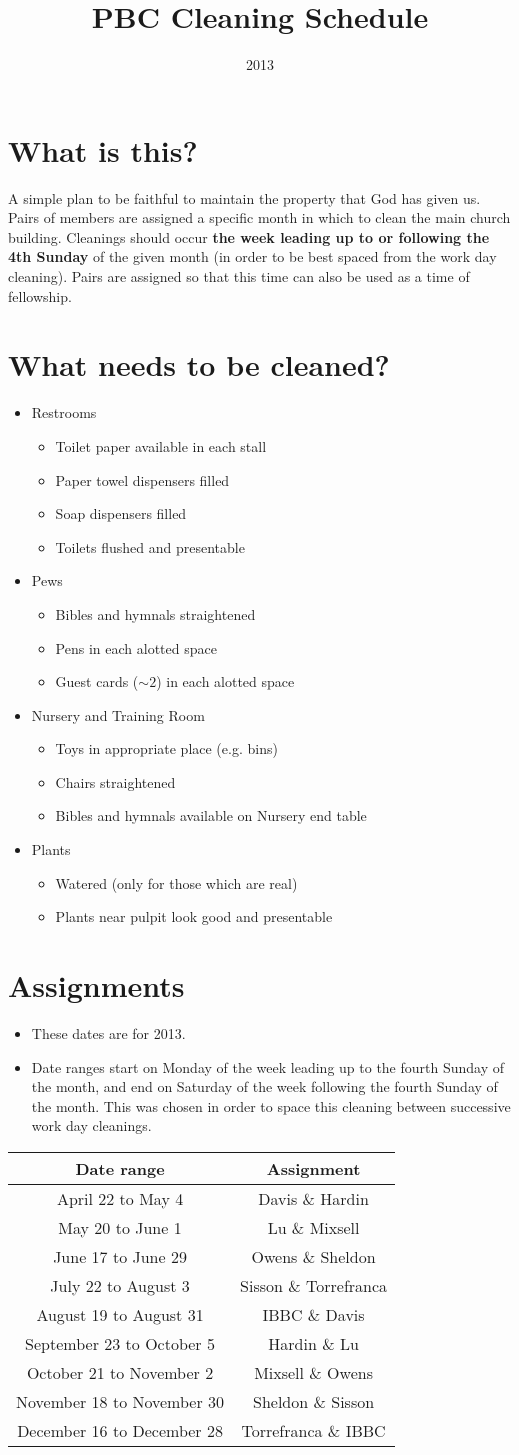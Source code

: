 \documentclass[12pt]{article}
\title{PBC Cleaning Schedule}
\date{2013}
\newcommand{\BI}{\begin{itemize}\item}
\newcommand{\I}{\item}
\newcommand{\EI}{\end{itemize}}
\begin{document}
\maketitle
\section{What is this?}
A simple plan to be faithful to maintain the property that God has given us.
Pairs of members are assigned a specific month in which
    to clean the main church building.
Cleanings should occur \textbf{the week leading up to or following the 4th Sunday} 
    of the given month 
    (in order to be best spaced from the work day cleaning).
Pairs are assigned so that this time can also be used as a time of fellowship.

\section{What needs to be cleaned?}
\BI Restrooms
    \BI Toilet paper available in each stall
    \I  Paper towel dispensers filled
    \I  Soap dispensers filled
    \I  Toilets flushed and presentable \EI
\I  Pews
    \BI Bibles and hymnals straightened
    \I  Pens in each alotted space
    \I  Guest cards ($\sim2$) in each alotted space \EI
\I  Nursery and Training Room
    \BI Toys in appropriate place (e.g. bins)
    \I  Chairs straightened
    \I  Bibles and hymnals available on Nursery end table \EI
\I  Plants
    \BI Watered (only for those which are real)
    \I  Plants near pulpit look good and presentable \EI
\EI
\section{Assignments}
\BI These dates are for 2013.
\I  Date ranges start on Monday of the week leading up to 
    the fourth Sunday of the month, and
    end on Saturday of the week following the fourth Sunday of the month.
    This was chosen in order to space this cleaning between
        successive work day cleanings. \EI
\begin{center}
\begin{tabular}{|c|c|}
    \hline
    Date range & Assignment \\
    \hline \hline
    April 22 to May 4 & Davis \& Hardin \\ \hline
    May 20 to June 1 & Lu \& Mixsell \\ \hline
    June 17 to June 29 & Owens \& Sheldon \\ \hline
    July  22 to August 3 & Sisson \& Torrefranca \\ \hline
    August 19 to August 31 & IBBC \& Davis \\ \hline
    September 23 to October 5 & Hardin \& Lu \\ \hline
    October 21 to November 2 & Mixsell \& Owens \\ \hline
    November 18 to November 30 & Sheldon \& Sisson \\ \hline
    December 16 to December 28 & Torrefranca \& IBBC \\ \hline
\end{tabular}
\end{center}
\end{document}

